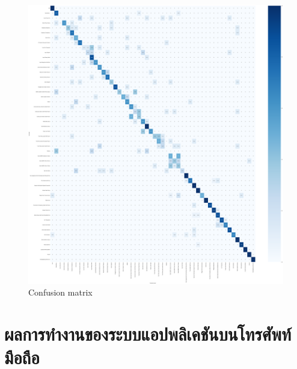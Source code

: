\begin{figure}[h]
    \begin{center}

        \includegraphics[scale=0.1]{pic/model/blind_pic_4_ccm.png}
    \end{center}

    \caption[Confusion matrix]{Confusion matrix}
    \label{fig:Confusion matrix}
\end{figure}




\newpage
\section{ผลการทำงานของระบบแอปพลิเคชันบนโทรศัพท์มือถือ}




